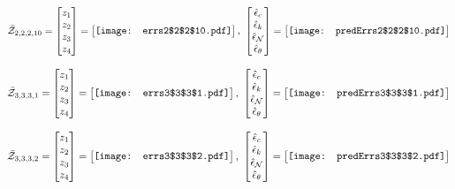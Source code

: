 \documentclass[12pt]{article}
\begin{document}
\begin{gather*}
\bar{\mathcal{Z}}_{2,2,2,10}=\begin{bmatrix}
z_1\\
z_2\\
z_3\\
z_4
 \end{bmatrix}= \begin{bmatrix}
\vcenter{\hbox{\texttt{[image: errs2\$2\$2\$10.pdf]}}}
 \end{bmatrix},\,\, \begin{bmatrix}
\hat{\epsilon}_c\\\hat{\epsilon}_k\\\hat{\epsilon}_\mathcal{N}\\\hat{\epsilon}_\theta
 \end{bmatrix}=\begin{bmatrix}
\vcenter{\hbox{\texttt{[image: predErrs2\$2\$2\$10.pdf]}}}
 \end{bmatrix}
\end{gather*}

\begin{gather*}
\bar{\mathcal{Z}}_{3,3,3,1}=\begin{bmatrix}
z_1\\
z_2\\
z_3\\
z_4
 \end{bmatrix}= \begin{bmatrix}
\vcenter{\hbox{\texttt{[image: errs3\$3\$3\$1.pdf]}}}
 \end{bmatrix},\,\, \begin{bmatrix}
\hat{\epsilon}_c\\\hat{\epsilon}_k\\\hat{\epsilon}_\mathcal{N}\\\hat{\epsilon}_\theta
 \end{bmatrix}=\begin{bmatrix}
\vcenter{\hbox{\texttt{[image: predErrs3\$3\$3\$1.pdf]}}}
 \end{bmatrix}
\end{gather*}


\begin{gather*}
\bar{\mathcal{Z}}_{3,3,3,2}=\begin{bmatrix}
z_1\\
z_2\\
z_3\\
z_4
 \end{bmatrix}= \begin{bmatrix}
\vcenter{\hbox{\texttt{[image: errs3\$3\$3\$2.pdf]}}}
 \end{bmatrix},\,\, \begin{bmatrix}
\hat{\epsilon}_c\\\hat{\epsilon}_k\\\hat{\epsilon}_\mathcal{N}\\\hat{\epsilon}_\theta
 \end{bmatrix}=\begin{bmatrix}
\vcenter{\hbox{\texttt{[image: predErrs3\$3\$3\$2.pdf]}}}
 \end{bmatrix}
\end{gather*}
\end{document}
